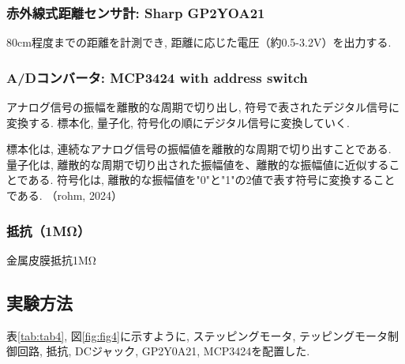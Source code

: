 \documentclass{ltjsarticle} %
\begin{document}
\subsubsection{⾚外線式距離センサ計: Sharp GP2YOA21}
80cm程度までの距離を計測でき, 距離に応じた電圧（約0.5-3.2V）を出⼒する. 

\subsubsection{A/Dコンバータ: MCP3424 with address switch}
アナログ信号の振幅を離散的な周期で切り出し, 符号で表されたデジタル信号に変換する. 
標本化, 量子化, 符号化の順にデジタル信号に変換していく. 

標本化は, 連続なアナログ信号の振幅値を離散的な周期で切り出すことである. 
量子化は, 離散的な周期で切り出された振幅値を、離散的な振幅値に近似することである. 
符号化は, 離散的な振幅値を"0"と"1"の2値で表す符号に変換することである. 
（rohm, 2024）

\subsubsection{抵抗（1MΩ）}
金属皮膜抵抗1MΩ
 

\subsection{実験方法}
表\ref{tab:tab4}, 図\ref{fig:fig4}に示すように, ステッピングモータ, テッピングモータ制御回路, 抵抗, 
DCジャック, GP2Y0A21, MCP3424を配置した. 
\end{document}
